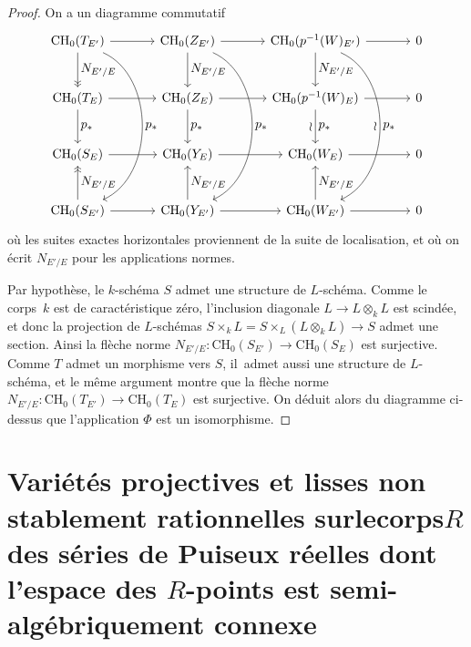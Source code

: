 \documentclass[11pt]{article}
\let\ts\textstyle
\newcommand{\CH}{\mathrm{CH}}
\theoremstyle{definition}
\begin{document}
\begin{proof}
On a un diagramme commutatif
\[
\begin{tikzcd}[row sep=2.7em, column sep=3.5em]
\CH_{0}(T_{E'}) \arrow[r] \arrow[d,->>,"\ts N_{E'/E}"] \arrow[ddd, bend left=66,"\ts p_*"] &
\CH_{0}(Z_{E'}) \arrow[r] \arrow[d,"\ts N_{E'/E}"] \arrow[ddd, bend left=66,"\ts p_*"] &
\CH_{0}(p^{-1}(W)_{E'}) \arrow[r] \arrow[d,"\ts N_{E'/E}"] \arrow[ddd, bend left=66,"\ts \wr"',"\ts p_*"] &
0 \\
\CH_{0}(T_{E}) \arrow[r] \arrow[d,"\ts p_*"] &
\CH_{0}(Z_{E}) \arrow[r] \arrow[d,"\ts p_*"] &
\CH_{0}(p^{-1}(W)_{E}) \arrow[r] \arrow[d,"\ts \wr"',"\ts p_*"] &
0 \\
\CH_{0}(S_{E}) \arrow[r] &
\CH_{0}(Y_{E}) \arrow[r] &
\CH_{0}(W_{E}) \arrow[r] &
0 \\
\CH_{0}(S_{E'}) \arrow[r] \arrow[u,->>,swap,"\ts N_{E'/E}"] &
\CH_{0}(Y_{E'}) \arrow[r] \arrow[u,swap,"\ts N_{E'/E}"] &
\CH_{0}(W_{E'}) \arrow[r] \arrow[u,swap,"\ts N_{E'/E}"] &
0
\end{tikzcd}
\]
où les suites exactes horizontales proviennent de la suite de localisation, et où on écrit $N_{E'/E}$ pour les applications normes.

Par hypothèse, le $k$-schéma $S$ admet une structure de $L$-schéma. Comme le corps~$k$ est de caractéristique zéro, l'inclusion diagonale $L\to L\otimes_kL$ est scindée, et donc la projection de $L$-schémas $S\times_kL=S\times_L(L\otimes_kL)\to S$ admet une section. Ainsi la flèche norme $N_{E'/E}\colon \CH_{0}(S_{E'}) \to \CH_{0}(S_{E})$ est surjective. Comme $T$ admet un morphisme vers $S$, il~admet aussi une structure de $L$-schéma, et le même argument montre que la flèche norme $N_{E'/E}\colon \CH_{0}(T_{E'}) \to \CH_{0}(T_{E})$ est surjective.
On déduit alors du diagramme ci-dessus que l'application $\Phi$ est un isomorphisme.
\end{proof}

\section{Variétés projectives et lisses non stablement rationnelles sur\nobreakspace le\nobreakspace corps\nobreakspace \texorpdfstring{$R$}{R} des séries de Puiseux réelles dont l'espace des \texorpdfstring{$R$}{R}-points est semi-algébriquement connexe}
\label{paraex}
\end{document}

